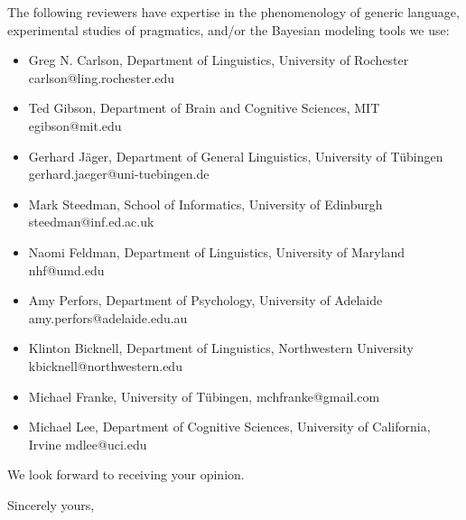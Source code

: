 \documentclass[11pt,letterpaper]{letter} %
\begin{document}
\begin{letter}
The following reviewers have expertise in the phenomenology of generic language, experimental studies of pragmatics, and/or the Bayesian modeling tools we use:

\begin{itemize}
\item Greg N. Carlson, Department of Linguistics, University of Rochester carlson@ling.rochester.edu
\item Ted Gibson, Department of Brain and Cognitive Sciences, MIT egibson@mit.edu
\item Gerhard J{\"a}ger, Department of General Linguistics, University of T{\"u}bingen gerhard.jaeger@uni-tuebingen.de
\item Mark Steedman, School of Informatics, University of Edinburgh  steedman@inf.ed.ac.uk
\item Naomi Feldman, Department of Linguistics, University of Maryland nhf@umd.edu
\item Amy Perfors, Department of Psychology, University of Adelaide amy.perfors@adelaide.edu.au
\item Klinton Bicknell, Department of Linguistics, Northwestern University kbicknell@northwestern.edu
\item Michael Franke, University of T{\"u}bingen, mchfranke@gmail.com
\item Michael Lee, Department of Cognitive Sciences, University of California, Irvine mdlee@uci.edu
\end{itemize}

We look forward to receiving your opinion.


\closing{Sincerely yours,}


\end{letter}
\end{document}
